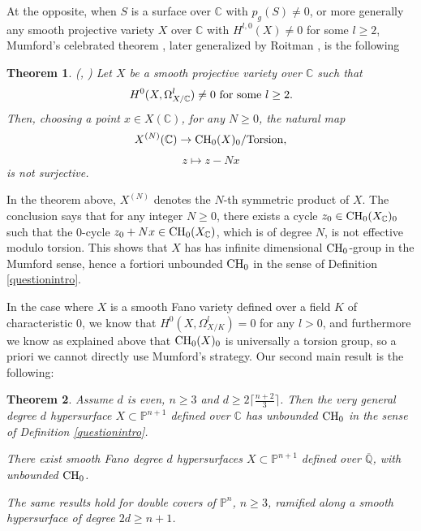\documentclass[10pt]{article}
\newtheorem{theo}{Theorem}[section]
\begin{document}
At the opposite, when  $S$ is a  surface over $\mathbb{C}$ with $p_g(S)\not=0$, or more generally any smooth projective variety $X$ over $\mathbb{C}$ with $H^{l,0}(X)\not=0$ for some $l\geq 2$,  Mumford's  celebrated theorem \cite{mumford}, later generalized by Roitman \cite{roitman}, is   the following
\begin{theo}\label{theomumford} (\cite{mumford}, \cite{roitman}) Let $X$ be a smooth projective variety over $\mathbb{C}$ such that  $$H^0(X,\Omega_{X/\mathbb{C}}^l)\not=0\,\,{\rm for \,\,some}\,\, l\geq 2.$$ Then, choosing a  point $x\in X(\mathbb{C})$, for any $N\geq 0$, the natural map
$$X^{(N)}(\mathbb{C})\rightarrow {\rm CH}_0(X)_{0}/{\rm Torsion},$$
$$ z\mapsto z-N x$$
is not surjective.
\end{theo}
In the theorem above,  $X^{(N)}$ denotes the $N$-th symmetric product of $X$.
The conclusion  says that for any integer $N\geq 0$, there exists a cycle
$z_0\in {\rm CH}_0(X_\mathbb{C})_{0}$ such that the $0$-cycle $z_0+N x\in {\rm CH}_0(X_\mathbb{C})$, which is  of degree $N$, is not effective modulo torsion. This  shows that $X$ has has infinite dimensional ${\rm CH}_0$-group in the  Mumford sense, hence { a fortiori}  unbounded  ${\rm CH}_0$  in the sense of Definition \ref{questionintro}.

In  the case where $X$ is a smooth  Fano variety defined over a field $K$ of characteristic $0$, we know that $H^0(X,\Omega_{X/K}^l)=0$ for any $l> 0$, and furthermore we know as explained above that ${\rm CH}_0(X)_0$ is universally a torsion group, so a priori we cannot directly use Mumford's strategy.
Our second main result is the following:
\begin{theo}\label{theomain} Assume $d$ is even, $n\geq 3$ and $d\geq 2\lceil\frac{n+2}{3}\rceil$. Then the very general degree $d$ hypersurface
$X\subset \mathbb{P}^{n+1}$  defined over $\mathbb{C}$ has unbounded  ${\rm CH}_0$ in the sense of Definition \ref{questionintro}.

There exist smooth Fano degree $d$ hypersurfaces $X\subset \mathbb{P}^{n+1}$ defined over $\overline{\mathbb{Q}}$, with unbounded  ${\rm CH}_0$.

The same results hold for  double covers of $\mathbb{P}^n$, $n\geq 3$, ramified along a smooth hypersurface of degree $2d\geq n+1$.
\end{theo}
\end{document}
